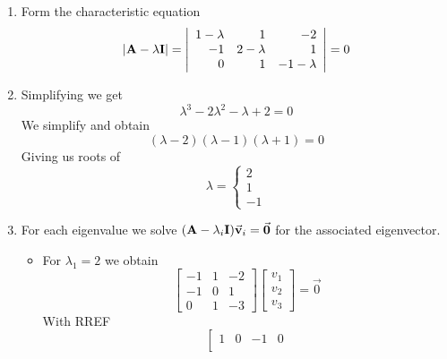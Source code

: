         \begin{enumerate}
            \item Form the characteristic equation
                \[
                    \lvert \mathbf{A} - \lambda \mathbf{I} \rvert = 
                    \left| \begin{array}{rrr}
                        1 - \lambda & 1 & -2\\
                        -1 & 2 - \lambda & 1\\
                        0 & 1 & -1 - \lambda
                    \end{array} \right|  = 0 \]
            \item Simplifying we get
                \[ \lambda^3 - 2 \lambda^2 - \lambda + 2 = 0 \]
                We simplify and obtain
                \[ (\lambda - 2)(\lambda - 1)(\lambda + 1) = 0 \]
                Giving us roots of
                \[ \boxed{\lambda = \begin{cases}
                    2\\
                    1\\
                    -1
                \end{cases}} \]
            \item For each eigenvalue we solve $( \ma - \lambda_i \mathbf{I}) \vec{v}_i = \vec{0}$ for the associated eigenvector.
                \begin{itemize}
                    \item For $\lambda_1 = 2$ we obtain
                        \[
                            \left[ \begin{array}{rrr}
                                -1 & 1 & -2\\
                                -1 & 0 & 1\\
                                0 & 1 & -3
                            \end{array} \right]
                            \left[ \begin{array}{r}
                                v_1\\ v_2\\ v_3
                            \end{array} \right]
                            = \vec{0}
                        \]
                        With RREF
                        \[
                            \left[ \begin{array}{rrr|r}
                                1 & 0 & -1 & 0\\

\end{array}\]
\end{itemize}
\end{enumerate}
